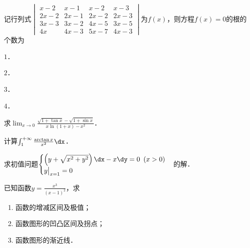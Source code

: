 \documentclass[plain,noanswer,medmath]{../../template/jnuexam}
\begin{document}
\begin{problem}
记行列式$\begin{vmatrix}
   x - 2 &  x - 1 &  x - 2 & x - 3 \\
  2x - 2 & 2x - 1 & 2x - 2 & 2x - 3 \\
  3x - 3 & 3x - 2 & 4x - 5 & 3x - 5 \\
      4x & 4x - 3 & 5x - 7 & 4x - 3
\end{vmatrix}$为$f(x)$，则方程$f(x) = 0$的根的个数为\pickout{}
\begin{abcd}
\item $1$．
\item $2$．
\item $3$．
\item $4$．
\end{abcd}
\end{problem}



\begin{problem}
求$\lim_{x \to 0} \frac{\sqrt{1 + \tan x} - \sqrt{1 + \sin x}}{x\ln \left(1 + x \right) - x^2}$．
\end{problem}



\begin{problem}
计算$\int_1^{+\infty} \frac{\arctan x}{x^2}\dx$．
\end{problem}



\begin{problem}
求初值问题$\begin{cases}
  \left(y + \sqrt{x^2 + y^2} \right)\dx - x\dy = 0\enspace(x > 0) \\
  y\big|_{x = 1} = 0 \\
\end{cases}$的解．
\end{problem}






\begin{problem}
已知函数$y = \frac{x^3}{(x - 1)^2}$，求
\begin{enumerate}
\item 函数的增减区间及极值；
\item 函数图形的凹凸区间及拐点；
\item 函数图形的渐近线．
\end{enumerate}
\end{problem}
\end{document}
